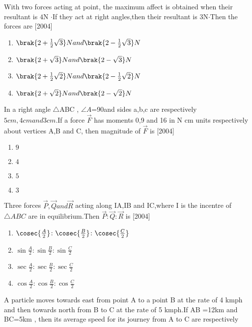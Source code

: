 \iffalse
\title{22.MISCELLANEOUS}
\author{AI24BTECH11006 - Bugada Roopansha}
\section{mcq-single}
\fi
\item With two forces acting at point, the maximum affect is obtained when their resultant is $4$N $\cdot$If they act at right angles,then their resultant is $3$N$\cdot$Then the forces are
\hfill{[2004]}
\begin{enumerate}
\item $\brak{2+\frac{1}{2}\sqrt{3}}N and\brak{2-\frac{1}{2}\sqrt{3}}N$
\item $\brak{2+\sqrt{3}}N and \brak{2-\sqrt{3}}N$
\item  $\brak{2+\frac{1}{2}\sqrt{2}}N and\brak{2-\frac{1}{2}\sqrt{2}}N$
\item $\brak{2+\sqrt{2}}N and \brak{2-\sqrt{2}}N$
\end{enumerate}
\item In a right angle $\triangle$ABC , $\angle A$=90\degree and sides a,b,c are respectively $5cm,4cm and 3cm .$If a force $ \vec{F}$ has moments 0,9 and 16 in N cm units respectively about vertices A,B and C, then magnitude of $\vec{F}$ is
\hfill{[2004]}
\begin{enumerate}
\item $9$
\item $4$
\item $5$
\item $3$
\end{enumerate}
\item Three forces $\vec{P},\vec{Q} and\vec{R}$ acting along IA,IB and IC,where I is the incentre of $\triangle{ABC}$ are in equilibrium.Then $\vec{P} \colon \vec{Q} \colon \vec{R}$ is
\hfill{[2004]}
\begin{enumerate}
\item $\cosec{\frac{A}{2}}\colon\cosec{\frac{B}{2}}\colon\cosec{\frac{C}{2}}$
\item $\sin{\frac{A}{2}}\colon\sin{\frac{B}{2}}\colon\sin{\frac{C}{2}}$
\item $\sec{\frac{A}{2}}\colon\sec{\frac{B}{2}}\colon\sec{\frac{C}{2}}$
\item $\cos{\frac{A}{2}}\colon \cos{\frac{B}{2}}\colon \cos{\frac{C}{2}}$
\end{enumerate}
\item A particle moves towards east from point A to a point B at the rate of 4 kmph and then towards north from B to C at the rate of 5 kmph.If AB =12km and BC=5km , then its average speed for its journey from A to C are respectively
